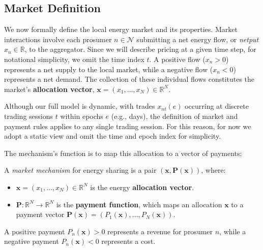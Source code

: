 \documentclass[12pt, notitlepage]{article}
\begin{document}
\subsection{Market Definition}




We now formally define the local energy market and its properties. 
Market interactions involve each prosumer $n \in \mathcal{N}$ submitting a net energy flow, or \textit{netput} $x_n \in \mathbb{R}$, to the aggregator. Since we will describe pricing at a given time step, for notational simplicity, we omit the time index $t$. A positive flow ($x_n > 0$) represents a net supply to the local market, while a negative flow ($x_n < 0$) represents a net demand. The collection of these individual flows constitutes the market's \textbf{allocation vector}, $\bm{x} = (x_1, \dots, x_N) \in \mathbb{R}^N$. 

Although our full model is dynamic, with trades $x_{nt}(e)$ occurring at discrete trading sessions $t$ within epochs $e$ (e.g., days), the definition of market and payment rules applies to any single trading session. For this reason, for now we adopt a static view and omit the time and epoch index for simplicity.


The mechanism's function is to map this allocation to a vector of payments:

\begin{definition}
A \textit{market mechanism} for energy sharing is a pair $(\bm{x}, \bm{P}(\bm{x}))$, where:
\begin{itemize}
    \item $\bm{x} = (x_1, \dots, x_N) \in \mathbb{R}^N$ is the energy \textbf{allocation vector}.
    \item $\bm{P}: \mathbb{R}^N \to \mathbb{R}^N$ is the \textbf{payment function}, which maps an allocation $\bm{x}$ to a payment vector $\bm{P}(\bm{x}) = (P_1(\bm{x}), \dots, P_N(\bm{x}))$.
\end{itemize}
A positive payment $P_n(\bm{x}) > 0$ represents a revenue for prosumer $n$, while a negative payment $P_n(\bm{x}) < 0$ represents a cost.
\end{definition} 
\end{document}

